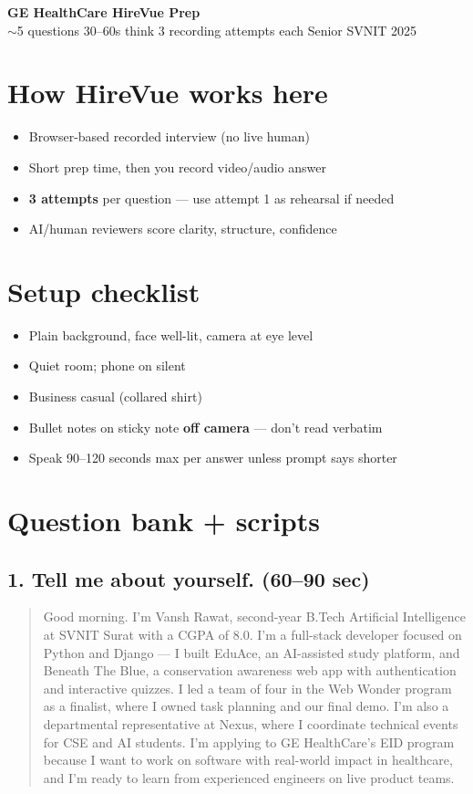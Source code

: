\documentclass[11pt,a4paper]{article}
\newcommand{\Q}[1]{\textbf{\color{q}#1}}
\newcommand{\Say}[1]{\begin{quote}\small #1\end{quote}}
\begin{document}
\begin{center}
  {\LARGE\bfseries GE HealthCare HireVue Prep}\\[4pt]
  {\small $\sim$5 questions \textbar{} 30--60s think \textbar{} 3 recording attempts each \textbar{} Senior SVNIT 2025}
\end{center}

\section{How HireVue works here}
\begin{itemize}
  \item Browser-based recorded interview (no live human)
  \item Short prep time, then you record video/audio answer
  \item \textbf{3 attempts} per question --- use attempt 1 as rehearsal if needed
  \item AI/human reviewers score clarity, structure, confidence
\end{itemize}

\section{Setup checklist}
\begin{itemize}
  \item Plain background, face well-lit, camera at eye level
  \item Quiet room; phone on silent
  \item Business casual (collared shirt)
  \item Bullet notes on sticky note \textbf{off camera} --- don't read verbatim
  \item Speak 90--120 seconds max per answer unless prompt says shorter
\end{itemize}

\section{Question bank + scripts}

\subsection{\Q{1. Tell me about yourself.} (60--90 sec)}
\Say{
Good morning. I'm Vansh Rawat, second-year B.Tech Artificial Intelligence at SVNIT Surat with a CGPA of 8.0. I'm a full-stack developer focused on Python and Django --- I built EduAce, an AI-assisted study platform, and Beneath The Blue, a conservation awareness web app with authentication and interactive quizzes. I led a team of four in the Web Wonder program as a finalist, where I owned task planning and our final demo. I'm also a departmental representative at Nexus, where I coordinate technical events for CSE and AI students. I'm applying to GE HealthCare's EID program because I want to work on software with real-world impact in healthcare, and I'm ready to learn from experienced engineers on live product teams.
}
\end{document}

